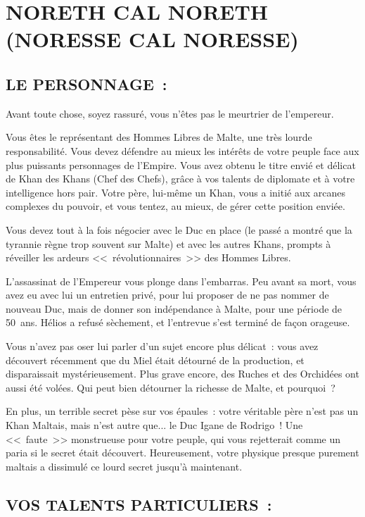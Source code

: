 \documentclass[14pt,twocolumn]{extarticle}
\begin{document}
\section{NORETH CAL NORETH\\(NORESSE CAL NORESSE)}

\subsection{LE PERSONNAGE~:}

Avant toute chose, soyez rassuré, vous n'êtes pas le meurtrier de l'empereur.

Vous êtes le représentant des Hommes Libres de Malte, une très lourde
responsabilité. Vous devez défendre au mieux les intérêts de votre peuple face
aux plus puissants personnages de l'Empire. Vous avez obtenu le titre envié et
délicat de Khan des Khans (Chef des Chefs), grâce à vos talents de diplomate et
à votre intelligence hors pair. Votre père, lui-même un Khan, vous a initié
aux arcanes complexes du pouvoir, et vous tentez, au mieux, de gérer cette
position enviée.

Vous devez tout à la fois négocier avec le Duc en place (le passé a montré que
la tyrannie règne trop souvent sur Malte) et avec les autres Khans, prompts à
réveiller les ardeurs <<~révolutionnaires~>> des Hommes Libres.

L'assassinat de l'Empereur vous plonge dans l'embarras. Peu avant sa mort, vous
avez eu avec lui un entretien privé, pour lui proposer de ne pas nommer de
nouveau Duc, mais de donner son indépendance à Malte, pour une période de
50~ans. Hélios a refusé sèchement, et l'entrevue s'est terminé de façon
orageuse.

Vous n'avez pas oser lui parler d'un sujet encore plus délicat~: vous avez
découvert récemment que du Miel était détourné de la production, et
disparaissait mystérieusement. Plus grave encore, des Ruches et des Orchidées
ont aussi été volées. Qui peut bien détourner la richesse de Malte, et
pourquoi~?

En plus, un terrible secret pèse sur vos épaules~: votre véritable père n'est
pas un Khan Maltais, mais n'est autre que... le Duc Igane de Rodrigo~! Une
<<~faute~>> monstrueuse pour votre peuple, qui vous rejetterait comme un
paria si le secret était découvert. Heureusement, votre physique presque
purement maltais a dissimulé ce lourd secret jusqu'à maintenant.

\subsection{VOS TALENTS PARTICULIERS~:}
\end{document}
